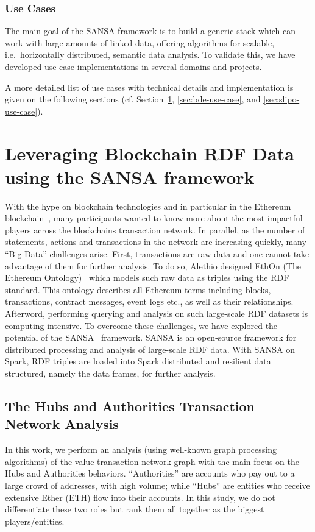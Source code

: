 \subsubsection{Use Cases}
The main goal of the SANSA framework is to build a generic stack which can work with large amounts of linked data, offering algorithms for scalable, i.e.~horizontally distributed, semantic data analysis.
To validate this, we have developed use case implementations in several domains and projects.
   
A more detailed list of use cases with technical details and implementation is given on the following sections (cf. Section~\ref{sec:alethio-use-case}, \ref{sec:bde-use-case}, and \ref{sec:slipo-use-case}).

\section{Leveraging Blockchain RDF Data using the SANSA framework}
\label{sec:alethio-use-case}
With the hype on blockchain technologies and in particular in the Ethereum blockchain~\cite{wood2014ethereum}, many participants wanted to know more about the most impactful players across the blockchains transaction network.
In parallel, as the number of statements, actions and transactions in the network are increasing quickly, many ``Big Data'' challenges arise.
First, transactions are raw data and one cannot take advantage of them for further analysis.
To do so, Alethio designed EthOn (The Ethereum Ontology)~\cite{pfeffer2016ethon} which models such raw data as triples using the \gls{RDF} standard.
This ontology describes all Ethereum terms including blocks, transactions, contract messages, event logs etc., as well as their relationships.
Afterword, performing querying and analysis on such large-scale RDF datasets is computing intensive.
To overcome these challenges, we have explored the potential of the SANSA~\cite{lehmann-2017-sansa-iswc} framework.
SANSA is an open-source framework for distributed processing and analysis of large-scale RDF data.
With SANSA on Spark, \gls{RDF} triples are loaded into Spark distributed and resilient data structured, namely the data frames, for further analysis.

\subsection{The Hubs and Authorities Transaction Network Analysis}
\label{sec:the-hub-and-authorities-use-case}
In this work, we perform an analysis (using well-known graph processing algorithms) of the value transaction network graph with the main focus on the Hubs and Authorities behaviors.
``Authorities'' are accounts who pay out to a large crowd of addresses, with high volume; while ``Hubs'' are entities who receive extensive Ether (ETH) flow into their accounts.
In this study, we do not differentiate these two roles but rank them all together as the biggest players/entities.

